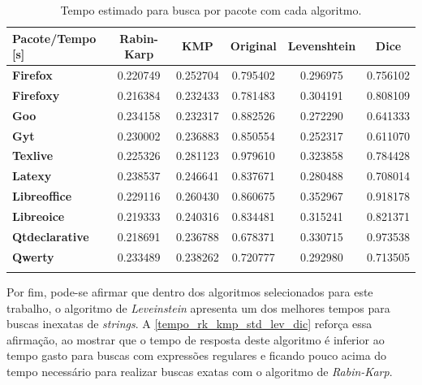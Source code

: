 \begin{longtable}{lccccc}
\caption{Tempo estimado para busca por pacote com cada algoritmo.}\\
\toprule
\textbf{Pacote/Tempo [s]} & \textbf{Rabin-Karp} & \textbf{KMP} & \textbf{Original} & \textbf{Levenshtein} & \textbf{Dice} \\ \midrule \rowcolor[gray]{0.9}
\textbf{Firefox} & 0.220749 & 0.252704 & 0.795402 & 0.296975 & 0.756102 \\ 
\textbf{Firefoxy} & 0.216384 & 0.232433 & 0.781483 & 0.304191 & 0.808109 \\ \rowcolor[gray]{0.9}
\textbf{Goo} & 0.234158 & 0.232317 & 0.882526 & 0.272290 & 0.641333 \\
\textbf{Gyt} & 0.230002 & 0.236883 & 0.850554 & 0.252317 & 0.611070 \\ \rowcolor[gray]{0.9}
\textbf{Texlive} & 0.225326 & 0.281123 & 0.979610 & 0.323858 & 0.784428 \\
\textbf{Latexy} & 0.238537 & 0.246641 & 0.837671 & 0.280488 & 0.708014 \\ \rowcolor[gray]{0.9}
\textbf{Libreoffice} & 0.229116 & 0.260430 & 0.860675 & 0.352967 & 0.918178 \\
\textbf{Libreoice} & 0.219333 & 0.240316 & 0.834481 & 0.315241 & 0.821371 \\ \rowcolor[gray]{0.9}
\textbf{Qtdeclarative} & 0.218691 & 0.236788 & 0.678371 & 0.330715 & 0.973538 \\
\textbf{Qwerty} & 0.233489 & 0.238262 & 0.720777 & 0.292980 & 0.713505 \\ \bottomrule
\label{}
\end{longtable}


Por fim, pode-se afirmar que dentro dos algoritmos selecionados para este trabalho, o algoritmo de \textit{Leveinstein} apresenta um dos melhores tempos para buscas inexatas de \textit{strings}. A \autoref{tempo_rk_kmp_std_lev_dic} reforça essa afirmação, ao mostrar que o tempo de resposta deste algoritmo é inferior ao tempo gasto para buscas com expressões regulares e ficando pouco acima do tempo necessário para realizar buscas exatas com o algoritmo de  \textit{Rabin-Karp}.